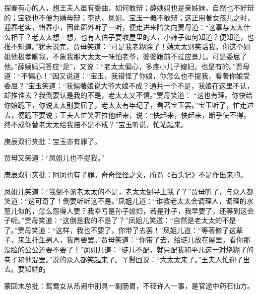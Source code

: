 \begin{parag}
    探春有心的人，想王夫人虽有委曲，如何敢辩；薛姨妈也是亲姊妹，自然也不好辩的；宝钗也不便为姨母辩；李纨、凤姐、宝玉一概不敢辩；这正用著女孩儿之时，迎春老实，惜春小，因此窗外听了一听，便走进来陪笑向贾母道：“这事与太太什么相干？老太太想一想，也有大伯子要收屋里的人，小婶子如何知道？便知道，也推不知道。”犹未说完，贾母笑道：“可是我老糊涂了！姨太太别笑话我。你这个姐姐他极孝顺我，不象我那大太太一味怕老爷，婆婆跟前不过应景儿。可是委屈了他。”薛姨妈只答应“是”，又说：“老太太偏心，多疼小儿子媳妇，也是有的。”贾母道：“不偏心！”因又说道：“宝玉，我错怪了你娘，你怎么也不提我，看著你娘受委屈？”宝玉笑道：“我偏著娘说大爷大娘不成？通共一个不是，我娘在这里不认，却推谁去？我倒要认是我的不是，老太太又不信。”贾母笑道： “这也有理。你快给你娘跪下，你说太太别委屈了，老太太有年纪了，看著宝玉罢。”宝玉听了，忙走过去，便跪下要说；王夫人忙笑著拉他起来，说：“快起来，快起来，断乎使不得。终不成你替老太太给我赔不是不成？”宝玉听说，忙站起来。\begin{note}庚辰双行夹批：宝玉亦有罪了。\end{note}贾母又笑道：“凤姐儿也不提我。”\begin{note}庚辰双行夹批：阿凤也有了罪。奇奇怪怪之文，所谓《石头记》不是作出来的。\end{note}凤姐儿笑道：“我倒不派老太太的不是，老太太倒寻上我了？”贾母听了，与众人都笑道：“这可奇了！倒要听听这不是。”凤姐儿道：“谁教老太太会调理人，调理的水葱儿似的，怎么怨得人要？我幸亏是孙子媳妇，若是孙子，我早要了，还等到这会子呢。”贾母笑道：“这倒是我的不是了？”凤姐儿笑道：“自然是老太太的不是了。”贾母笑道：“这样，我也不要了，你带了去罢！”凤姐儿道：“等著修了这辈子，来生托生男人，我再要罢。”贾母笑道：“你带了去，给琏儿放在屋里，看你那没脸的公公还要不要了！”凤姐儿道：“琏儿不配，就只配我和平儿这一对烧糊了的卷子和他混罢。”说的众人都笑起来了。丫鬟回说：“大太太来了。”王夫人忙迎了出去。要知端的
\end{parag}


\begin{parag}
    \begin{note}蒙回末总批：鸳鸯女从热闹中别具一副肠胃，不轻许人一事，是官途中药石仙方。\end{note}
\end{parag}

